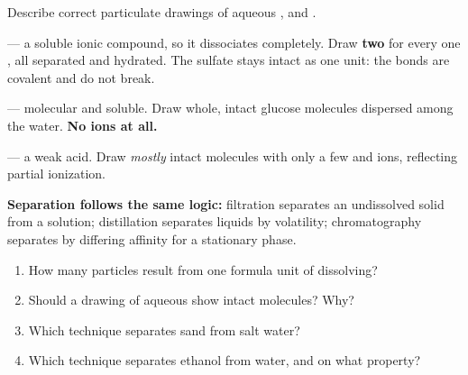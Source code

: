 \documentclass{apchem-worksheet}
\begin{document}
\begin{workedexample}
Describe correct particulate drawings of aqueous ,
 and .

\textbf{} --- a soluble ionic compound, so it dissociates
completely. Draw \textbf{two}  for every one , all
separated and hydrated. The sulfate stays intact as one unit: the
 bonds are covalent and do not break.

\textbf{} --- molecular and soluble. Draw whole, intact
glucose molecules dispersed among the water. \textbf{No ions at all.}

\textbf{} --- a weak acid. Draw \emph{mostly} intact 
molecules with only a few  and  ions, reflecting partial
ionization.

\textbf{Separation follows the same logic:} filtration separates an
undissolved solid from a solution; distillation separates liquids by
volatility; chromatography separates by differing affinity for a
stationary phase.
\end{workedexample}

\begin{yourturn}
\begin{enumerate}[leftmargin=*,itemsep=0.5em]
  \item How many particles result from one formula unit of 
        dissolving? \workspace[1.4cm]
  \item Should a drawing of aqueous  show intact 
        molecules? Why? \workspace[1.6cm]
  \item Which technique separates sand from salt water?
        \workspace[1.4cm]
  \item Which technique separates ethanol from water, and on what
        property? \workspace[1.6cm]
\end{enumerate}
\end{yourturn}
\end{document}

